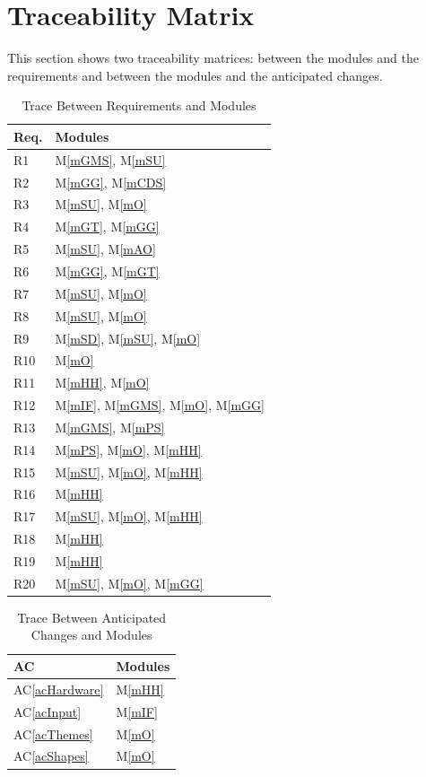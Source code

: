\documentclass[12pt, titlepage]{article}
\newcommand{\acref}[1]{AC\ref{#1}}
\newcommand{\mref}[1]{M\ref{#1}}
\begin{document}
\newpage
\section{Traceability Matrix} \label{SecTM}
This section shows two traceability matrices: between the modules and the
requirements and between the modules and the anticipated changes.
\begin{table}[H]
\centering
\begin{tabular}{p{} p{}}
\toprule
\textbf{Req.} & \textbf{Modules}\\
\midrule
R1 & \mref{mGMS}, \mref{mSU}\\
R2 & \mref{mGG}, \mref{mCDS}\\
R3 & \mref{mSU}, \mref{mO}\\
R4 & \mref{mGT}, \mref{mGG}\\
R5 & \mref{mSU}, \mref{mAO}\\
R6 & \mref{mGG}, \mref{mGT}\\
R7 & \mref{mSU}, \mref{mO}\\
R8 & \mref{mSU}, \mref{mO}\\
R9 & \mref{mSD}, \mref{mSU}, \mref{mO}\\
R10 & \mref{mO}\\
R11 & \mref{mHH}, \mref{mO}\\
R12 & \mref{mIF}, \mref{mGMS}, \mref{mO}, \mref{mGG}\\
R13 & \mref{mGMS}, \mref{mPS}\\
R14 & \mref{mPS}, \mref{mO}, \mref{mHH}\\
R15 & \mref{mSU}, \mref{mO}, \mref{mHH}\\
R16 & \mref{mHH}\\
R17 & \mref{mSU}, \mref{mO}, \mref{mHH}\\
R18 & \mref{mHH}\\
R19 & \mref{mHH}\\
R20 & \mref{mSU}, \mref{mO}, \mref{mGG}\\
\bottomrule
\end{tabular}
\caption{Trace Between Requirements and Modules}
\label{TblRT}
\end{table}

\begin{table}[H]
\centering
\begin{tabular}{p{} p{}}
\toprule
\textbf{AC} & \textbf{Modules}\\
\midrule
\acref{acHardware} & \mref{mHH}\\
\acref{acInput} & \mref{mIF}\\
\acref{acThemes} & \mref{mO}\\
\acref{acShapes} & \mref{mO}\\
\end{tabular}
\caption{Trace Between Anticipated Changes and Modules}
\label{TblACT}
\end{table}
\end{document}
